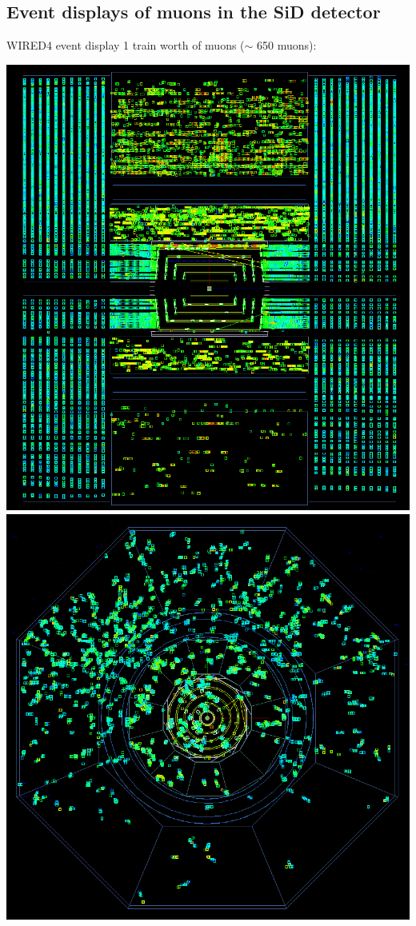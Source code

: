 \documentclass[xcolor={dvipsnames}]{beamer}
\begin{document}
\subsection{Event displays of muons in the SiD detector}
\begin{frame}{WIRED4 event display}
1 train worth of muons ($\sim$ 650 muons):
\begin{center}
\includegraphics[height=0.6\textheight]{sidloi3_muons_wired4_eventdisplay_1bunch.png}
\hspace*{0.2cm}
\includegraphics[height=0.6\textheight]{sidloi3_muons_wired4_eventdisplay_xy_view_1bunch.png}

\end{center}
\end{frame}
\end{document}
